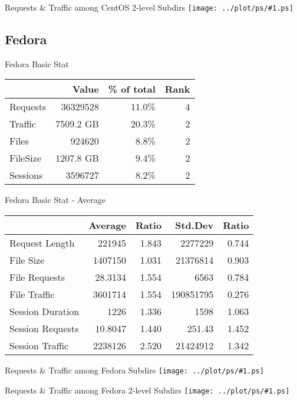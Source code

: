 \documentclass{beamer}
\newcommand\graph[1]{{\texttt{[image: ../plot/ps/\#1.ps]}}}
\begin{document}
\begin{frame}{Requests \& Traffic among CentOS 2-level Subdirs}
\graph{dist-subsubdir-centos}
\end{frame}

\subsection{Fedora}

\begin{frame}{Fedora Basic Stat}
\begin{tabular}[t]{|l|r|r|r|}
\hline
 & Value & \% of total & Rank \\
\hline
Requests& 36329528 & 11.0\% & 4 \\
Traffic	& 7509.2 GB & 20.3\% & 2 \\
Files 	& 924620 & 8.8\% & 2 \\
FileSize& 1207.8 GB & 9.4\% & 2 \\
Sessions& 3596727 & 8.2\% & 2 \\
\hline
\end{tabular}
\end{frame}

\begin{frame}{Fedora Basic Stat - Average}
\begin{tabular}[t]{|l|r|r|r|r|}
\hline
 & Average & Ratio & Std.Dev & Ratio \\
\hline
Request Length	& 221945 & 1.843 & 2277229 & 0.744 \\
File Size	& 1407150 & 1.031 & 21376814 & 0.903 \\
File Requests	& 28.3134 & 1.554 & 6563 & 0.784 \\
File Traffic	& 3601714 & 1.554 & 190851795 & 0.276 \\
Session Duration& 1226 & 1.336 & 1598 & 1.063 \\
Session Requests& 10.8047 & 1.440 & 251.43 & 1.452 \\
Session Traffic & 2238126 & 2.520 & 21424912 & 1.342 \\
\hline
\end{tabular}
\end{frame}

\begin{frame}{Requests \& Traffic among Fedora Subdirs}
\graph{dist-subdir-fedora}
\end{frame}

\begin{frame}{Requests \& Traffic among Fedora 2-level Subdirs}
\graph{dist-subsubdir-fedora}
\end{frame}
\end{document}
